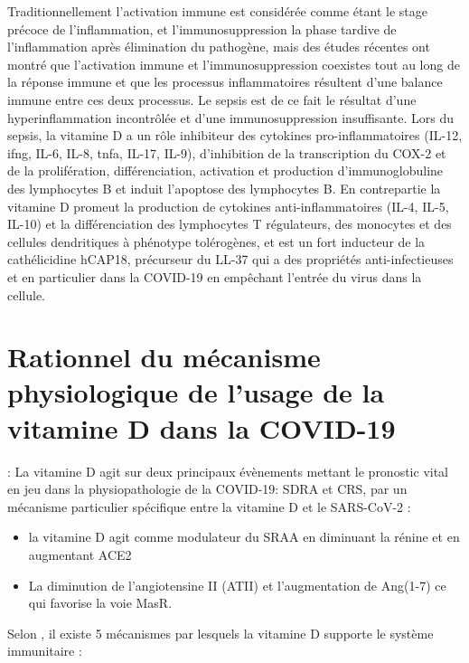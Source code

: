 \documentclass[
  a4paper,
  DIV=11,
  numbers=noendperiod,
  listof=totoc]{scrreprt}
\providecommand{\tightlist}{%
  \setlength{\itemsep}{0pt}\setlength{\parskip}{0pt}}\usepackage{longtable,booktabs,array}
\begin{document}
Traditionnellement l'activation immune est considérée comme étant le
stage précoce de l'inflammation, et l'immunosuppression la phase tardive
de l'inflammation après élimination du pathogène, mais des études
récentes ont montré que l'activation immune et l'immunosuppression
coexistes tout au long de la réponse immune et que les processus
inflammatoires résultent d'une balance immune entre ces deux processus.
Le sepsis est de ce fait le résultat d'une hyperinflammation incontrôlée
et d'une immunosuppression insuffisante. Lors du sepsis, la vitamine D a
un rôle inhibiteur des cytokines pro-inflammatoires (IL-12, \ac{ifng},
IL-6, IL-8, \ac{tnfa}, IL-17, IL-9), d'inhibition de la transcription du
COX-2 et de la prolifération, différenciation, activation et production
d'immunoglobuline des lymphocytes B et induit l'apoptose des lymphocytes
B. En contrepartie la vitamine D promeut la production de cytokines
anti-inflammatoires (IL-4, IL-5, IL-10) et la différenciation des
lymphocytes T régulateurs, des monocytes et des cellules dendritiques à
phénotype tolérogènes, et est un fort inducteur de la cathélicidine
hCAP18, précurseur du LL-37 qui a des propriétés anti-infectieuses et en
particulier dans la COVID-19 en empêchant l'entrée du virus dans la
cellule. \autocite{Cutuli.2024,Keutmann.2022}

\section{Rationnel du mécanisme physiologique de l'usage de la vitamine
D dans la
COVID-19}\label{rationnel-du-muxe9canisme-physiologique-de-lusage-de-la-vitamine-d-dans-la-covid-19}

\textcite{Borsche.2021}: La vitamine D agit sur deux principaux
évènements mettant le pronostic vital en jeu dans la physiopathologie de
la COVID-19: \ac{SDRA} et \ac{CRS}, par un mécanisme particulier
spécifique entre la vitamine D et le SARS-CoV-2 :

\begin{itemize}
\tightlist
\item
  la vitamine D agit comme modulateur du \ac{SRAA} en diminuant la
  rénine et en augmentant ACE2
\item
  La diminution de l'angiotensine II (ATII) et l'augmentation de
  Ang(1-7) ce qui favorise la voie MasR.
\end{itemize}

Selon \textcite{Borsche.2021}, il existe 5 mécanismes par lesquels la
vitamine D supporte le système immunitaire :
\end{document}
